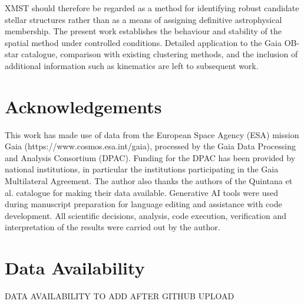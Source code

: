 \documentclass[fleqn,usenatbib]{mnras}
\begin{document}
XMST should therefore be regarded as a method for identifying robust candidate stellar structures rather than as a means of assigning definitive astrophysical membership. The present work establishes the behaviour and stability of the spatial method under controlled conditions. Detailed application to the Gaia OB-star catalogue, comparison with existing clustering methods, and the inclusion of additional information such as kinematics are left to subsequent work.

\section*{Acknowledgements}

This work has made use of data from the European Space Agency (ESA) mission Gaia (https://www.cosmos.esa.int/gaia), processed by the Gaia Data Processing and Analysis Consortium (DPAC). Funding for the DPAC has been provided by national institutions, in particular the institutions participating in the Gaia Multilateral Agreement.
The author also thanks the authors of the Quintana et al. catalogue for making their data available.
Generative AI tools were used during manuscript preparation for language editing and assistance with code development. All scientific decisions, analysis, code execution, verification and interpretation of the results were carried out by the author.


\section*{Data Availability}

 
DATA AVAILABILITY TO ADD AFTER GITHUB UPLOAD

















\bsp	%
\label{lastpage}
\end{document}
